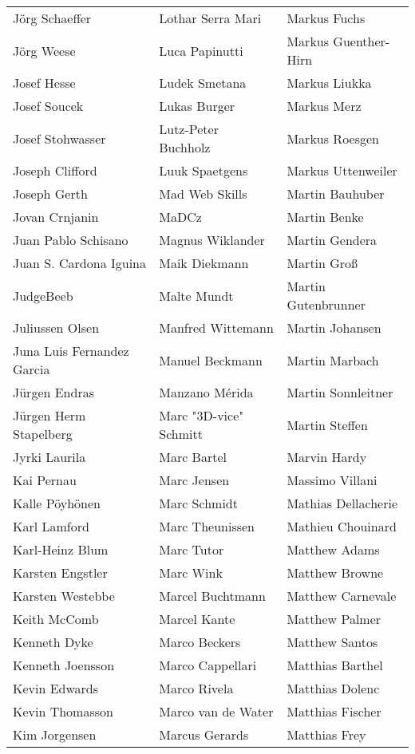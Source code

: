 \begin{small}
\begin{tabular}{p{4cm}p{4cm}p{4cm}}
Jörg Schaeffer & Lothar Serra Mari & Markus Fuchs \\
Jörg Weese & Luca Papinutti & Markus Guenther-Hirn \\
Josef Hesse & Ludek Smetana & Markus Liukka \\
Josef Soucek & Lukas Burger & Markus Merz \\
Josef Stohwasser & Lutz-Peter Buchholz & Markus Roesgen \\
Joseph Clifford & Luuk Spaetgens & Markus Uttenweiler \\
Joseph Gerth & Mad Web Skills & Martin Bauhuber \\
Jovan Crnjanin & MaDCz & Martin Benke \\
Juan Pablo Schisano & Magnus Wiklander & Martin Gendera \\
Juan S. Cardona Iguina & Maik Diekmann & Martin Groß \\
JudgeBeeb & Malte Mundt & Martin Gutenbrunner \\
Juliussen Olsen & Manfred Wittemann & Martin Johansen \\
Juna Luis Fernandez Garcia & Manuel Beckmann & Martin Marbach \\
Jürgen Endras & Manzano Mérida & Martin Sonnleitner \\
Jürgen Herm Stapelberg & Marc "3D-vice" Schmitt & Martin Steffen \\
Jyrki Laurila & Marc Bartel & Marvin Hardy \\
Kai Pernau & Marc Jensen & Massimo Villani \\
Kalle Pöyhönen & Marc Schmidt & Mathias Dellacherie \\
Karl Lamford & Marc Theunissen & Mathieu Chouinard \\
Karl-Heinz Blum & Marc Tutor & Matthew Adams \\
Karsten Engstler & Marc Wink & Matthew Browne \\
Karsten Westebbe & Marcel Buchtmann & Matthew Carnevale \\
Keith McComb & Marcel Kante & Matthew Palmer \\
Kenneth Dyke & Marco Beckers & Matthew Santos \\
Kenneth Joensson & Marco Cappellari & Matthias Barthel \\
Kevin Edwards & Marco Rivela & Matthias Dolenc \\
Kevin Thomasson & Marco van de Water & Matthias Fischer \\
Kim Jorgensen & Marcus Gerards & Matthias Frey \\

\end{tabular}
\end{small}
